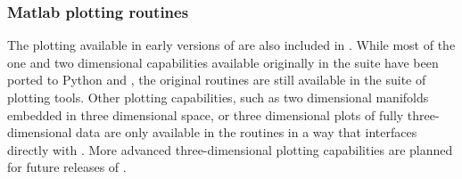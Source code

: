 \subsubsection{Matlab plotting routines}
The \mlab plotting available in early versions of \clawpack are also included in
\visclaw.  While most of the one and two dimensional capabilities
available originally in the \mlab suite have been ported to Python and
\mplotlib, the original \mlab routines are still available in the \mlab suite of
plotting tools.  Other plotting capabilities, such as two dimensional
manifolds embedded in three dimensional space, or three dimensional
plots of fully three-dimensional data are only available in the \mlab routines
in a way that
interfaces directly with \clawpack.
More advanced three-dimensional plotting capabilities are planned for future
releases of
\visclaw.
